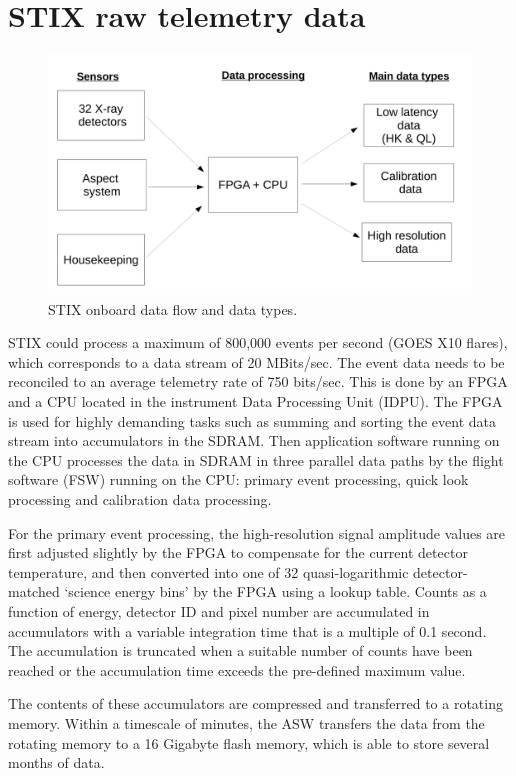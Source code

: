 \documentclass{aa}
\begin{document}
\section{STIX raw telemetry data}

\begin{figure}
    \centering
    \includegraphics[width=0.8\linewidth]{figures/onboardDataFlow.pdf}
    \caption{STIX onboard data flow and data types.}
    \label{fig:stix_onbard_data_flow}
\end{figure}

STIX could process a maximum of 800,000 events per second (GOES X10 flares), which corresponds to  a data stream  of 20 MBits/sec. The event data needs to be reconciled to an average telemetry rate of 750 bits/sec.  This is done by an FPGA and a CPU located in the instrument Data Processing Unit (IDPU).  The FPGA is used for highly demanding tasks such as summing and sorting the event data stream into accumulators in the SDRAM.  Then application software running on the CPU processes the data in SDRAM 
in three parallel data paths by the flight software (FSW) running on the CPU: primary event processing, quick look processing and calibration data processing. 

For the primary event processing, the high-resolution signal amplitude values are first adjusted slightly by the FPGA to compensate for the current detector temperature, and then converted 
into one of 32 quasi-logarithmic detector-matched ‘science energy bins’ by the FPGA using a lookup table. Counts as a function of energy, detector ID and pixel number are accumulated in accumulators with a variable integration time that is a multiple of 0.1 second.  
The accumulation is truncated when a suitable number of counts have been reached or the accumulation time exceeds the pre-defined maximum value.

The contents of these accumulators are compressed and transferred to a rotating memory. 
Within a timescale of minutes, the ASW transfers the data from the rotating memory to a 16 Gigabyte flash memory, which is able to store several months of data.
\end{document}
